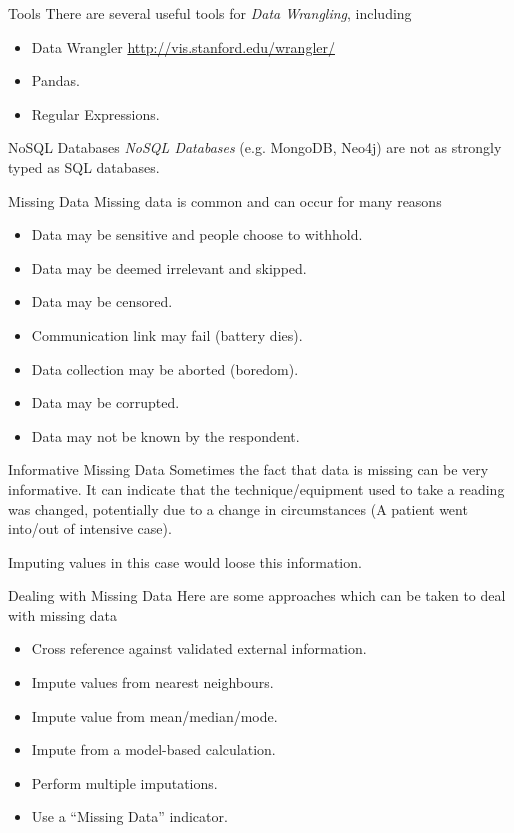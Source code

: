 \documentclass[11pt,a4paper]{article}
\begin{document}
  \begin{remark}{Tools}
    There are several useful tools for \textit{Data Wrangling}, including
    \begin{itemize}
      \item Data Wrangler \url{http://vis.stanford.edu/wrangler/}
      \item Pandas.
      \item Regular Expressions.
    \end{itemize}
  \end{remark}

  \begin{remark}{NoSQL Databases}
    \textit{NoSQL Databases} (e.g. MongoDB, Neo4j) are not as strongly typed as SQL databases.
  \end{remark}

  \begin{remark}{Missing Data}
    Missing data is common and can occur for many reasons
    \begin{itemize}
      \item Data may be sensitive and people choose to withhold.
      \item Data may be deemed irrelevant and skipped.
      \item Data may be censored.
      \item Communication link may fail (battery dies).
      \item Data collection may be aborted (boredom).
      \item Data may be corrupted.
      \item Data may not be known by the respondent.
    \end{itemize}
  \end{remark}

  \begin{remark}{Informative Missing Data}
    Sometimes the fact that data is missing can be very informative. It can indicate that the technique/equipment used to take a reading was changed, potentially due to a change in circumstances (A patient went into/out of intensive case).
    \par Imputing values in this case would loose this information.

  \end{remark}

  \begin{remark}{Dealing with Missing Data}
    Here are some approaches which can be taken to deal with missing data
    \begin{itemize}
      \item Cross reference against validated external information.
      \item Impute values from nearest neighbours.
      \item Impute value from mean/median/mode.
      \item Impute from a model-based calculation.
      \item Perform multiple imputations.
      \item Use a ``Missing Data'' indicator.
    \end{itemize}
  \end{remark}
\end{document}
